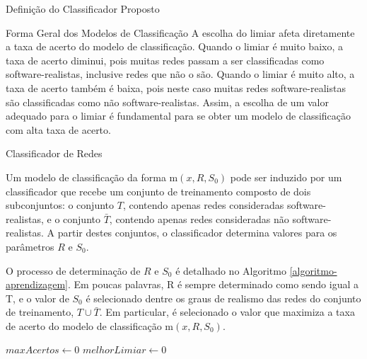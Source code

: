 \begin{section}{Definição do Classificador Proposto}
\begin{subsection}{Forma Geral dos Modelos de Classificação}
	A escolha do limiar afeta diretamente a taxa de acerto do modelo de classificação. Quando o limiar é muito baixo, a taxa de acerto diminui, pois muitas redes passam a ser classificadas como software-realistas, inclusive redes que não o são. Quando o limiar é muito alto, a taxa de acerto também é baixa, pois neste caso muitas redes software-realistas são classificadas como não software-realistas. Assim, a escolha de um valor adequado para o limiar é fundamental para se obter um modelo de classificação com alta taxa de acerto.

\end{subsection}

\begin{subsection}{Classificador de Redes}

	Um modelo de classificação da forma $\mathrm{m}(x, R, S_0)$ pode ser induzido por um classificador que recebe um conjunto de treinamento composto de dois subconjuntos: o conjunto $T$, contendo apenas redes consideradas software-realistas, e o conjunto $\bar{T}$, contendo apenas redes consideradas não software-realistas. A partir destes conjuntos, o classificador determina valores para os parâmetros $R$ e $S_0$. 
	
	O processo de determinação de $R$ e $S_0$ é detalhado no Algoritmo \ref{algoritmo-aprendizagem}. Em poucas palavras, R é sempre determinado como sendo igual a T, e o valor de $S_0$ é selecionado dentre os graus de realismo das redes do conjunto de treinamento, $T \cup \bar{T}$. Em particular, é selecionado o valor que maximiza a taxa de acerto do modelo de classificação $\mathrm{m}(x, R, S_0)$.
	

	
\begin{algorithm}
\caption{Algoritmo que Determina os Parâmetros $R$ e $S_0$ de um Modelo de Classificação a Partir dos Conjuntos $T$ e $\bar{T}$} \label{algoritmo-aprendizagem}
\begin{algorithmic}
\STATE $maxAcertos \gets 0$
\STATE $melhorLimiar \gets 0$


\end{algorithmic}
\end{algorithm}
\end{subsection}
\end{section}
